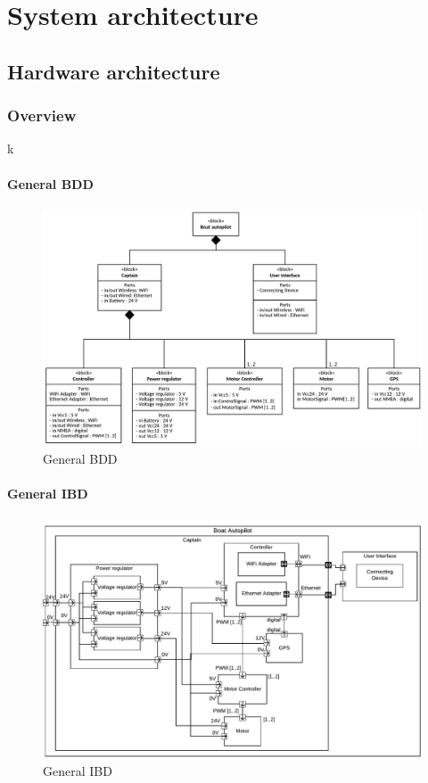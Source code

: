 \chapter{System architecture}

\section{Hardware architecture}
\subsection{Overview}
k

\subsubsection{General BDD}
\begin{figure}[H]
	\centering
	\includegraphics[width=1\linewidth]{Images/General_BDD}
	\caption{General BDD}
	\label{fig:generalbdd}
\end{figure}


\subsubsection{General IBD}
\begin{figure}[H]
	\centering
	\includegraphics[width=1\linewidth]{Images/General_IBD}
	\caption{General IBD}
	\label{fig:generalibd}
\end{figure}

